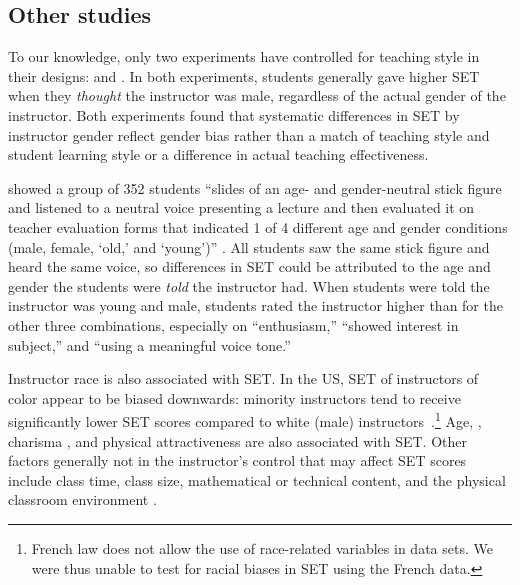 \documentclass[12pt]{article}
\begin{document}
\subsection{Other studies}
To our knowledge, only two experiments have controlled for teaching style in
their designs: \citet{Arbuckle2003} and \citet{MacNell2014}. 
In both experiments, students generally gave higher SET when they 
\emph{thought} the instructor
was male, regardless of the actual gender of the instructor.
Both experiments found that systematic differences in SET by instructor gender reflect gender bias 
rather than a match of teaching style and student learning style or a difference
in actual teaching effectiveness. 

\citet{Arbuckle2003} showed a group of 352 students 
``slides of an age- and gender-neutral stick figure and listened to a neutral voice 
presenting a lecture and then evaluated it on teacher evaluation forms that indicated 
1 of 4 different age and gender conditions 
(male, female, `old,' and `young')'' \citep[p.507]{Arbuckle2003}. 
All  students saw the same stick figure and heard the same voice, so differences in SET 
could be attributed to the age and gender the students were \emph{told} the instructor had.
When students were told the instructor was
young and male, students rated the instructor higher than for
the other three combinations, especially on ``enthusiasm,'' ``showed interest in subject,'' 
and ``using a meaningful voice tone.'' 

Instructor race is also associated with SET.
In the US, SET of instructors of color appear to be biased downwards:
minority instructors tend to receive significantly lower SET scores compared to white (male) 
instructors~\citep{Merritt2008}.\footnote{%
  French law does not allow the use of race-related variables in data sets. 
  We were thus unable to test for racial biases in SET using the French data.
} 
Age, \citep{Arbuckle2003}, 
charisma \citep{Shevlin2000}, and 
physical attractiveness \citep{Riniolo2006,Hamermesh2005} 
are also associated with SET.
Other factors generally not in the instructor's control that may affect SET scores include
class time, class size, mathematical or technical content, and the 
physical classroom environment \citep{Hill2010}.
\end{document}
